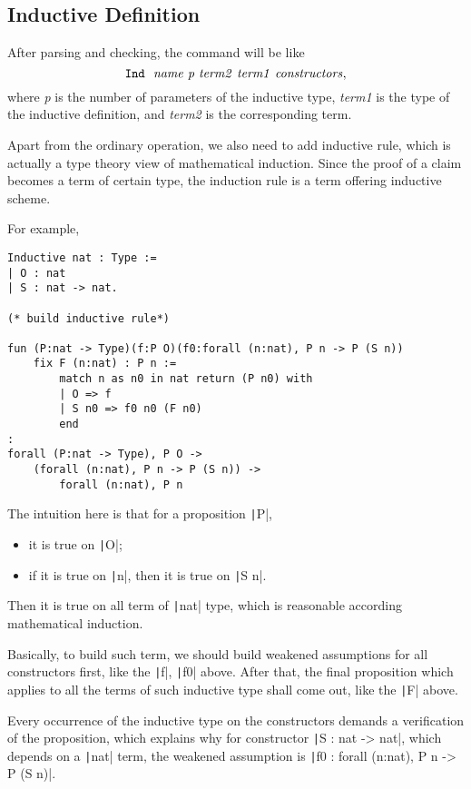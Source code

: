 \subsection{Inductive Definition}
After parsing and checking, the command will be like
$$
\tt Ind\ \ {\it name\ p\ term2\ term1\ constructors},
$$
where {\it p} is the number of parameters of the inductive type, {\it term1} is the type of the inductive definition,
and {\it term2} is the corresponding term.\par
Apart from the ordinary operation, we also need to add inductive rule, which is actually a type theory view of mathematical
induction. Since the proof of a claim becomes a term of certain type, the induction rule is a term offering inductive scheme.\par
For example,
\begin{center}
\begin{verbatim}
Inductive nat : Type := 
| O : nat
| S : nat -> nat.

(* build inductive rule*)

fun (P:nat -> Type)(f:P O)(f0:forall (n:nat), P n -> P (S n))
    fix F (n:nat) : P n :=
        match n as n0 in nat return (P n0) with
        | O => f
        | S n0 => f0 n0 (F n0)
        end
:
forall (P:nat -> Type), P O -> 
    (forall (n:nat), P n -> P (S n)) ->
        forall (n:nat), P n
\end{verbatim}
\end{center}
The intuition here is that for a proposition \texttt|P|,
\begin{itemize}
\item it is true on \texttt|O|;
\item if it is true on \texttt|n|, then it is true on \texttt|S n|.
\end{itemize}
Then it is true on all term of \texttt|nat| type, which is reasonable according 
mathematical induction.\par
Basically, to build such term, we should build weakened assumptions for all constructors first, 
like the \texttt|f|,
\texttt|f0| above. After that, the final proposition which applies to all the terms of such inductive type
shall come out, like the \texttt|F| above.\par
Every occurrence of the inductive type on the constructors demands a verification of the proposition,
which explains why for constructor \texttt|S : nat -> nat|, which depends on a \texttt|nat| term, 
the weakened assumption is \texttt|f0 : forall (n:nat), P n -> P (S n)|.\par

